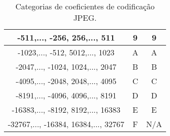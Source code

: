 \begin{table}[!ht]
\begin{tabular}{|c|c|c|}
-511,..., -256, 256,..., 511                               & 9                                                                   & 9                                                      \\ \hline
-1023,..., -512, 5012,..., 1023                            & A                                                                   & A                                                      \\ \hline
-2047,..., -1024, 1024,..., 2047                           & B                                                                   & B                                                      \\ \hline
-4095,..., -2048, 2048,..., 4095                           & C                                                                   & C                                                      \\ \hline
-8191,..., -4096, 4096,..., 8191                           & D                                                                   & D                                                      \\ \hline
-16383,..., -8192, 8192,..., 16383                         & E                                                                   & E                                                      \\ \hline
\multicolumn{1}{|l|}{-32767,..., -16384, 16384,..., 32767} & F                                                                   & N/A                                                    \\ \hline
\end{tabular}
\caption{Categorias de coeficientes de codificação JPEG.}
\label{Cat-coef-JPEG}
\end{table}

